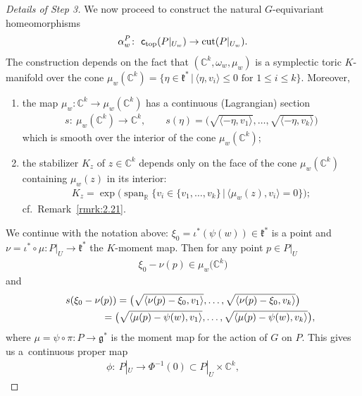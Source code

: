 \documentclass[10pt,a4paper]{amsart}
\numberwithin{equation}{section}
\begin{document}
\begin{proof}[Details of Step 3]
We now proceed to construct the natural $G$-equivariant homeomorphisms
\begin{gather*}
\alpha_w^P\colon \  {\textsf{c}_{\rm top}}(P|_{U_w}) \to \operatorname{cut}(P|_{U_w}).
\end{gather*}
The construction depends on the fact that $({\mathbb C}^k, \omega_w, \mu_w)$ is
a symplectic toric $K$-manifold over the cone $\mu_w ({\mathbb C}^k) = \{\eta
\in {\mathfrak k}^*\,|\, \langle \eta, v_i\rangle \leq 0 \text{ for } 1\leq i \leq k\}$.
Moreover,
\begin{enumerate}[1)]\itemsep=0pt
\item the map $\mu_w\colon {\mathbb C}^k \to \mu_w({\mathbb C}^k) $ has a continuous
  (Lagrangian) section
\begin{gather*}
s\colon \ \mu_w({\mathbb C}^k) \to {\mathbb C}^k, \qquad s(\eta) =
\big(\sqrt{\langle -\eta, v_1\rangle},\ldots, \sqrt{\langle -\eta, v_k\rangle}\big)
\end{gather*}
which is smooth over the interior of the cone $\mu_w ({\mathbb C}^k)$;
\item the stabilizer $K_z$ of $z\in {\mathbb C}^k$ depends only on the face of
  the cone $\mu_w ({\mathbb C}^k)$ containing $\mu_w(z)$ in its interior:
\begin{gather*}
K_z = \exp \big(\operatorname{span}_{\mathbb R} \{v_i \in \{v_1,\ldots, v_k\} \,|\, \langle
  \mu_w(z) , v_i\rangle = 0\}\big);
\end{gather*}
cf.\ Remark~\ref{rmrk:2.21}.
\end{enumerate}
We continue with the notation above: $\xi_0 = \iota^*(\psi(w)) \in
{\mathfrak k}^*$ is a point and $\nu= \iota^*\circ \mu \colon P|_U\to {\mathfrak k}^*$ the
$K$-moment map.  Then for any point $p\in P|_U$
\begin{gather*}
\xi_0 -\nu(p) \in \mu_w\big({\mathbb C}^k\big)
\end{gather*}
and
\begin{gather*}
s(\xi_0 -\nu(p) )  =  \big(\sqrt{\langle \nu(p) -\xi_0, v_1\rangle},\ldots,
\sqrt{\langle \nu(p) -\xi_0, v_k\rangle}\big)\\
\hphantom{s(\xi_0 -\nu(p) )}{}
 =  \big(\sqrt{\langle \mu(p) -\psi (w),
  v_1\rangle},\ldots, \sqrt{\langle \mu(p) -\psi(w), v_k\rangle}\big),
\end{gather*}
where $\mu = \psi \circ \pi\colon P\to {\mathfrak g}^*$ is the moment map for the
action of $G$ on $P$.  This gives us a~continuous proper map
\begin{gather*}
\phi\colon \  P|_U\to \Phi^{-1} (0) \subset P|_U \times {\mathbb C}^k, \qquad

\end{gather*}
\end{proof}
\end{document}
